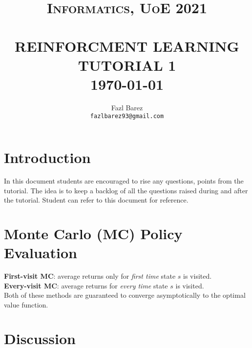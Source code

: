 \documentclass[paper=a4, fontsize=11pt,twoside]{scrartcl}	%
\title{	\normalsize \textsc{Informatics, UoE 2021} 	%
		 	\\[2.0cm]								%
			\HRule{0.5pt} \\						%
			\LARGE \textbf{\uppercase{Reinforcment Learning Tutorial 1}}	%
			\HRule{2pt} \\ [0.5cm]		%
			\normalsize \today			%
		}
\author{
		Fazl Barez\\	
        \texttt{fazlbarez93@gmail.com} \\
}
\makeatletter
\def\printtitle{%
    {\centering \@title\par}}
\def\printauthor{%
    {\centering \large \@author}}
\makeatother
\begin{document}
\thispagestyle{empty}		%

\printtitle					%
  	\vfill
\printauthor				%
\newpage
\setcounter{page}{1}		%
\section*{Introduction}

In this document students are encouraged to rise any questions, points from the tutorial. 
The idea is to keep a backlog of all the questions raised during and after the tutorial. Student can refer to this document for reference. 

\section{Monte Carlo (MC) Policy Evaluation}
\textbf{First-visit MC}: average returns only for \textit{first time} state $s$ is visited.\\
\textbf{Every-visit MC}: average returns for \textit{every time} state $s$ is visited.\\
Both of these methods are guaranteed to converge asymptotically to the optimal value function.

\section*{Discussion}
\end{document}
